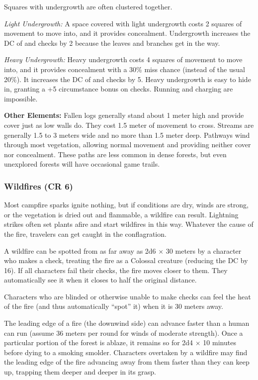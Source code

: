 Squares with undergrowth are often clustered together. %

\textit{Light Undergrowth:} A space covered with light undergrowth costs 2 squares of movement to move into, and it provides concealment. Undergrowth increases the DC of  and  checks by 2 because the leaves and branches get in the way.

\textit{Heavy Undergrowth:} Heavy undergrowth costs 4 squares of movement to move into, and it provides concealment with a 30\% miss chance (instead of the usual 20\%). It increases the DC of  and  checks by 5. Heavy undergrowth is easy to hide in, granting a +5 circumstance bonus on  checks. Running and charging are impossible.

\textbf{Other Elements:} Fallen logs generally stand about 1 meter high and provide cover just as low walls do. They cost 1.5 meter of movement to cross. Streams are generally 1.5 to 3 meters wide and no more than 1.5 meter deep. Pathways wind through most vegetation, allowing normal movement and providing neither cover nor concealment. These paths are less common in dense forests, but even unexplored forests will have occasional game trails.

\subsubsection{Wildfires (CR 6)}
Most campfire sparks ignite nothing, but if conditions are dry, winds are strong, or the vegetation is dried out and flammable, a wildfire can result. Lightning strikes often set plants afire and start wildfires in this way. Whatever the cause of the fire, travelers can get caught in the conflagration.

A wildfire can be spotted from as far away as 2d6 $\times$ 30 meters by a character who makes a  check, treating the fire as a Colossal creature (reducing the DC by 16). If all characters fail their  checks, the fire moves closer to them. They automatically see it when it closes to half the original distance.

Characters who are blinded or otherwise unable to make  checks can feel the heat of the fire (and thus automatically ``spot'' it) when it is 30 meters away.

The leading edge of a fire (the downwind side) can advance faster than a human can run (assume 36 meters per round for winds of moderate strength). Once a particular portion of the forest is ablaze, it remains so for 2d4 $\times$ 10 minutes before dying to a smoking smolder. Characters overtaken by a wildfire may find the leading edge of the fire advancing away from them faster than they can keep up, trapping them deeper and deeper in its grasp.

